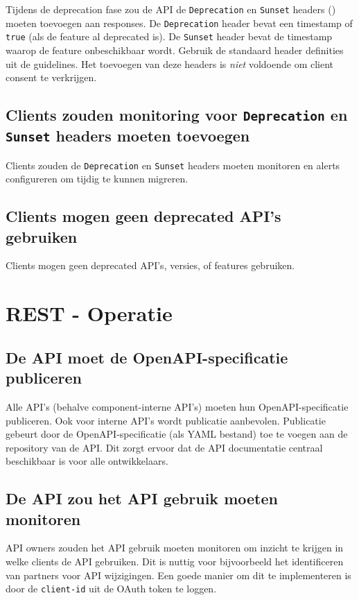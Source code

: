 Tijdens de deprecation fase zou de API de \texttt{Deprecation} en \texttt{Sunset} headers (\autocite{rfc8594}) moeten toevoegen aan responses. De \texttt{Deprecation} header bevat een timestamp of \texttt{true} (als de feature al deprecated is). De \texttt{Sunset} header bevat de timestamp waarop de feature onbeschikbaar wordt. Gebruik de standaard header definities uit de guidelines. Het toevoegen van deze headers is \textit{niet} voldoende om client consent te verkrijgen.

\subsection{Clients zouden monitoring voor \texttt{Deprecation} en \texttt{Sunset} headers moeten toevoegen}
\label{subsection:client_monitoring_deprecation}

Clients zouden de \texttt{Deprecation} en \texttt{Sunset} headers moeten monitoren en alerts configureren om tijdig te kunnen migreren.

\subsection{Clients mogen geen deprecated API's gebruiken}
\label{subsection:geen_gebruik_deprecated_apis}

Clients mogen geen deprecated API's, versies, of features gebruiken.

\section{REST - Operatie}

\subsection{De API moet de OpenAPI-specificatie publiceren}
\label{subsection:openapi_publiceren}

Alle API's (behalve component-interne API's) moeten hun OpenAPI-specificatie publiceren. Ook voor interne API's wordt publicatie aanbevolen. Publicatie gebeurt door de OpenAPI-specificatie (als YAML bestand) toe te voegen aan de repository van de API. Dit zorgt ervoor dat de API documentatie centraal beschikbaar is voor alle ontwikkelaars.

\subsection{De API zou het API gebruik moeten monitoren}
\label{subsection:api_gebruik_monitoren}

API owners zouden het API gebruik moeten monitoren om inzicht te krijgen in welke clients de API gebruiken. Dit is nuttig voor bijvoorbeeld het identificeren van partners voor API wijzigingen. Een goede manier om dit te implementeren is door de \texttt{client-id} uit de OAuth token te loggen.
